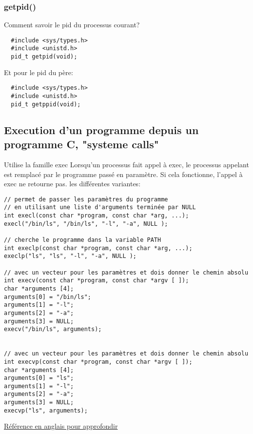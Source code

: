 \documentclass[a4paper]{article}
\begin{document}
\subsubsection{getpid()}
Comment savoir le pid du processus courant?
\begin{lstlisting}
  #include <sys/types.h>
  #include <unistd.h>
  pid_t getpid(void);
\end{lstlisting}
Et pour le pid du père:
\begin{lstlisting}
  #include <sys/types.h>
  #include <unistd.h>
  pid_t getppid(void);
\end{lstlisting}
\subsection{Execution d'un programme depuis un programme C, "systeme calls"}
Utilise la famille exec\newline
Lorsqu’un processus fait appel à exec, le processus appelant est remplacé par le programme passé en paramètre. Si cela fonctionne, l’appel à exec ne retourne pas.\newline
les différentes variantes:
\begin{lstlisting}
// permet de passer les paramètres du programme
// en utilisant une liste d'arguments terminée par NULL
int execl(const char *program, const char *arg, ...);
execl("/bin/ls", "/bin/ls", "-l", "-a", NULL );

// cherche le programme dans la variable PATH
int execlp(const char *program, const char *arg, ...);
execlp("ls", "ls", "-l", "-a", NULL );

// avec un vecteur pour les paramètres et dois donner le chemin absolu
int execv(const char *program, const char *argv [ ]);
char *arguments [4];
arguments[0] = "/bin/ls";
arguments[1] = "-l";
arguments[2] = "-a";
arguments[3] = NULL;
execv("/bin/ls", arguments);


// avec un vecteur pour les paramètres et dois donner le chemin absolu
int execvp(const char *program, const char *argv [ ]);
char *arguments [4];
arguments[0] = "ls";
arguments[1] = "-l";
arguments[2] = "-a";
arguments[3] = NULL;
execvp("ls", arguments);
\end{lstlisting}
\href{http://pubs.opengroup.org/onlinepubs/9699919799/functions/exec.html}{Référence en anglais pour approfondir}
\end{document}
